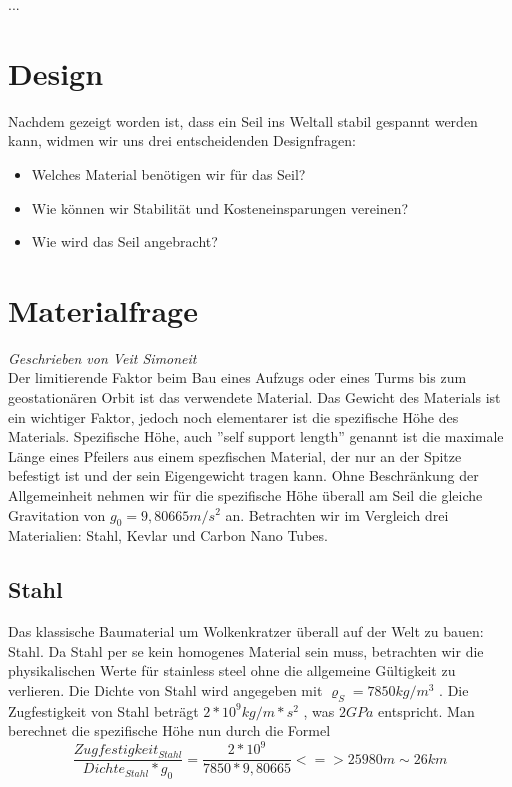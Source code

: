 \documentclass[a4paper, 10pt]{report}
\begin{document}
...
\section{Design}

Nachdem gezeigt worden ist, dass ein Seil ins Weltall stabil gespannt werden kann, widmen wir uns drei entscheidenden Designfragen: 
\begin{itemize}
\item Welches Material benötigen wir für das Seil?
\item Wie können wir Stabilität und Kosteneinsparungen vereinen?
\item Wie wird das Seil angebracht?
\end{itemize}

\section{Materialfrage}
\textsl{Geschrieben von Veit Simoneit}\\
Der limitierende Faktor beim Bau eines Aufzugs oder eines Turms bis zum geostationären Orbit ist das verwendete Material. Das Gewicht des Materials ist ein wichtiger Faktor, jedoch noch elementarer ist die spezifische Höhe des Materials. Spezifische Höhe, auch ''self support length'' genannt ist die maximale Länge eines Pfeilers aus einem spezfischen Material, der nur an der Spitze befestigt ist und der sein Eigengewicht tragen kann.\cite{3} %
Ohne Beschränkung der Allgemeinheit nehmen wir für die spezifische Höhe überall am Seil die gleiche Gravitation von $g_0 = 9,80665 m/s^2$ an.
Betrachten wir im Vergleich drei Materialien: Stahl, Kevlar und Carbon Nano Tubes. \cite[vergleiche]{2}
\subsection{Stahl}
Das klassische Baumaterial um Wolkenkratzer überall auf der Welt zu bauen: Stahl. Da Stahl per se kein homogenes Material sein muss, betrachten wir die physikalischen Werte für stainless steel ohne die allgemeine Gültigkeit zu verlieren. Die Dichte von Stahl wird angegeben mit $\varrho_S = 7850 kg/m^3$ \cite[Vgl.]{PE75}. Die Zugfestigkeit von Stahl beträgt $2*10^9 kg/m*s^2$ , was $2GPa$ entspricht. Man berechnet die spezifische Höhe nun durch die Formel 
\begin{equation}
\frac{Zugfestigkeit_{Stahl}}{Dichte_{Stahl}*g_0} = \frac{2*10^9}{7850*9,80665}
<=> 25 980 m \sim 26 km 
\end{equation}
\end{document}
